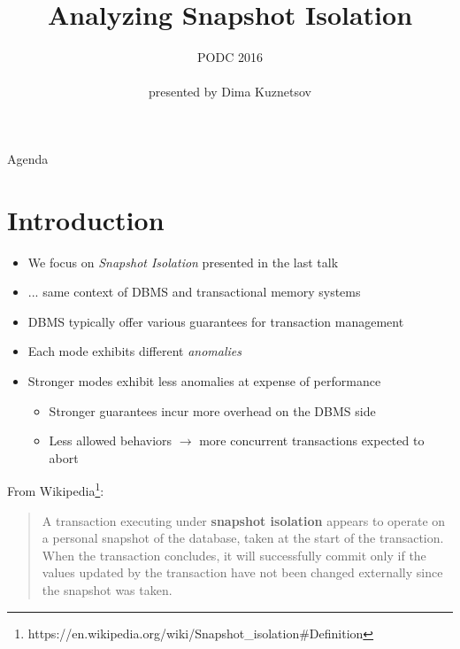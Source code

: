 \documentclass{beamer}
\title[Analyzing Snapshot Isolation] %
{Analyzing Snapshot Isolation}
\author[Andrea Cerone, Alexey Gotsman] %
{\textit{Andrea Cerone \and Alexey Gotsman}}
\institute[IMDEA] %
{IMDEA Software Institute}
\date[PODC 2016] %
{PODC 2016 \\ \hfill \\ \footnotesize presented by Dima Kuznetsov}
\begin{document}
\begin{frame}
	\titlepage
\end{frame}

\begin{frame}{Agenda}
	\tableofcontents
\end{frame}

\section{Introduction}

\begin{frame}
	\begin{itemize}
		\item We focus on \emph{Snapshot Isolation} presented in the last talk
		\item ... same context of DBMS and transactional memory systems
	\end{itemize}
\end{frame}

\begin{frame}
	\begin{itemize}
		\item DBMS typically offer various guarantees for transaction management
		\item Each mode exhibits different \emph{anomalies}
		\item Stronger modes exhibit less anomalies at expense of performance
		\begin{itemize}
			\item Stronger guarantees incur more overhead on the DBMS side
			\item Less allowed behaviors $ \rightarrow $ more concurrent transactions expected to abort
		\end{itemize}
	\end{itemize}
\end{frame}

\begin{frame}
	From Wikipedia\footnote{https://en.wikipedia.org/wiki/Snapshot\_isolation\#Definition}: \\
	\begin{quotation}
		A transaction executing under \textbf{snapshot isolation} appears to operate on a personal snapshot of the database, taken at the start of the transaction. When the transaction concludes, it will successfully commit only if the values updated by the transaction have not been changed externally since the snapshot was taken.
	\end{quotation}
\end{frame}
\end{document}
